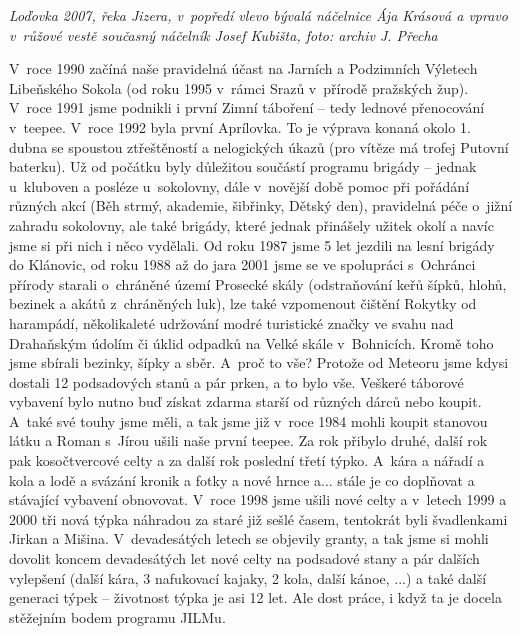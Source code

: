 \documentclass[a5paper, 11pt, twoside]{article}
\begin{document}
\textit{Loďovka 2007, řeka Jizera, v~popředí vlevo bývalá náčelnice Ája
Krásová a vpravo v~růžové vestě současný náčelník Josef Kubišta, foto:
archiv J. Přecha}

V~roce 1990 začíná naše pravidelná účast na Jarních a Podzimních
Výletech Libeňského Sokola (od roku 1995 v~rámci Srazů v~přírodě
pražských žup). V~roce 1991 jsme podnikli i první Zimní táboření -- tedy
lednové přenocování v~teepee. V~roce 1992 byla první Aprílovka. To je
výprava konaná okolo 1. dubna se spoustou ztřeštěností a nelogických
úkazů (pro vítěze má trofej Putovní baterku). Už od počátku byly
důležitou součástí programu brigády -- jednak u~kluboven a posléze
u~sokolovny, dále v~novější době pomoc při pořádání různých akcí (Běh
strmý, akademie, šibřinky, Dětský den), pravidelná péče o~jižní zahradu
sokolovny, ale také brigády, které jednak přinášely užitek okolí a navíc
jsme si při nich i něco vydělali. Od roku 1987 jsme 5 let jezdili na
lesní brigády do Klánovic, od roku 1988 až do jara 2001 jsme se ve
spolupráci s~Ochránci přírody starali o~chráněné území Prosecké skály
(odstraňování keřů šípků, hlohů, bezinek a akátů z~chráněných luk), lze
také vzpomenout čištění Rokytky od harampádí, několikaleté udržování
modré turistické značky ve svahu nad Drahaňským údolím či úklid odpadků
na Velké skále v~Bohnicích. Kromě toho jsme sbírali bezinky, šípky a
sběr. A~proč to vše? Protože od Meteoru jsme kdysi dostali 12
podsadových stanů a pár prken, a to bylo vše. Veškeré táborové vybavení
bylo nutno buď získat zdarma starší od různých dárců nebo koupit. A~také
své touhy jsme měli, a tak jsme již v~roce 1984 mohli koupit stanovou
látku a Roman s~Jírou ušili naše první teepee. Za rok přibylo druhé,
další rok pak kosočtvercové celty a za další rok poslední třetí týpko.
A~kára a nářadí a kola a lodě a svázání kronik a fotky a nové hrnce a...
stále je co doplňovat a stávající vybavení obnovovat. V~roce 1998 jsme
ušili nové celty a v~letech 1999 a 2000 tři nová týpka náhradou za staré
již sešlé časem, tentokrát byli švadlenkami Jirkan a Mišina.
V~devadesátých letech se objevily granty, a tak jsme si mohli dovolit
koncem devadesátých let nové celty na podsadové stany a pár dalších
vylepšení (další kára, 3 nafukovací kajaky, 2 kola, další kánoe, ...) a
také další generaci týpek -- životnost týpka je asi 12 let. Ale dost
práce, i když ta je docela stěžejním bodem programu JILMu.
\end{document}
